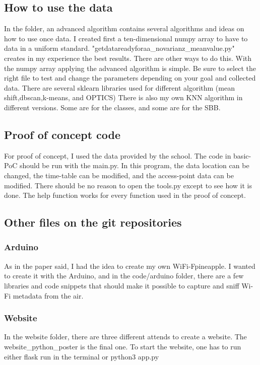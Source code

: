 \documentclass[11pt]{article}
\begin{document}
\subsection{How to use the data}
In the folder, an advanced algorithm contains several algorithms and ideas on how to use once data.
I created first a ten-dimensional numpy array to have to data in a uniform standard. "getdatareadyforaa\_novarianz\_meanvalue.py" creates in my experience the best results. There are other ways to do this. 
With the numpy array applying the advanced algorithm is simple. Be sure to select the right file to test and change the parameters depending on your goal and collected data.
There are several sklearn libraries used for different algorithm (mean shift,dbscan,k-means, and OPTICS)
There is also my own KNN algorithm in different versions. Some are for the classes, and some are for the SBB.

\subsection{Proof of concept code}
For proof of concept, I used the data provided by the school. The code in basic-PoC should be run with the main.py. In this program, the data location can be changed, the time-table can be modified, and the access-point data can be modified. There should be no reason to open the tools.py except to see how it is done. The help function works for every function used in the proof of concept.

\subsection{Other files on the git repositories}
\subsubsection{Arduino}
As in the paper said, I had the idea to create my own WiFi-Fpineapple. I wanted to create it with the Arduino, and in the code/arduino folder, there are a few libraries and code snippets that should make it possible to capture and sniff Wi-Fi metadata from the air.

\subsubsection{Website}
In the website folder, there are three different attends to create a website. The website\_python\_poster is the final one. To start the website, one has to run either flask run in the terminal or python3 app.py
\end{document}
